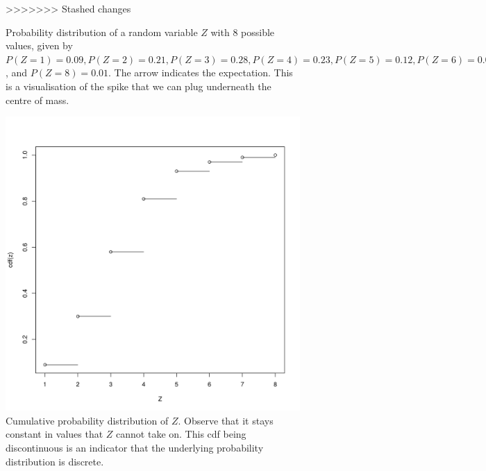 \documentclass[a4paper,11pt,leqno]{report}
\begin{document}
\begin{figure}
\caption{ Probability distribution of a random variable $Z$ with $ 8 $ possible values, given by $ P(Z = 1) = 0.09,  P(Z = 2) = 0.21, P(Z = 3) = 0.28, P(Z = 4) = 0.23, P(Z = 5) = 0.12, P(Z = 6) = 0.04, P(Z = 7) = 0.02$, and $ P(Z = 8) = 0.01$. The arrow indicates the expectation. This is a visualisation of 
the spike that we can plug underneath the centre of mass.}
>>>>>>> Stashed changes
\label{binomplot}
\end{figure}

\begin{figure}
\center
\includegraphics[scale=.4]{cdf.png}
\caption{Cumulative probability distribution of $ Z $. Observe that it stays constant in values that $ Z $ cannot take on. This cdf being discontinuous is an indicator
that the underlying probability distribution is discrete.}
\label{cdfPlot}
\end{figure}
\end{document}
